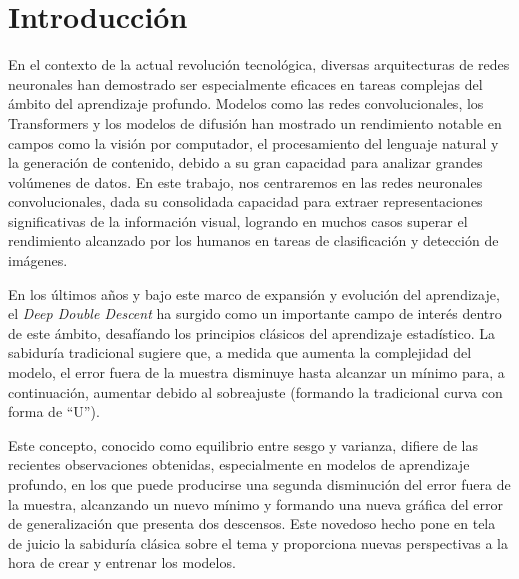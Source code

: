 %


\chapter{Introducción}

En el contexto de la actual revolución tecnológica, diversas arquitecturas de redes neuronales han demostrado ser especialmente eficaces en tareas complejas del ámbito del aprendizaje profundo. Modelos como las redes convolucionales, los Transformers y los modelos de difusión han mostrado un rendimiento notable en campos como la visión por computador, el procesamiento del lenguaje natural y la generación de contenido, debido a su gran capacidad para analizar grandes volúmenes de datos. En este trabajo, nos centraremos en las redes neuronales convolucionales, dada su consolidada capacidad para extraer representaciones significativas de la información visual, logrando en muchos casos superar el rendimiento alcanzado por los humanos en tareas de clasificación y detección de imágenes.

En los últimos años y bajo este marco de expansión y evolución del aprendizaje, el \emph{Deep Double Descent} ha surgido como un importante campo de interés dentro de este ámbito, desafíando los principios clásicos del aprendizaje estadístico. La sabiduría tradicional sugiere que, a medida que aumenta la complejidad del modelo, el error fuera de la muestra disminuye hasta alcanzar un mínimo para, a continuación, aumentar debido al sobreajuste (formando la tradicional curva con forma de ``U'').

Este concepto, conocido como equilibrio entre sesgo y varianza, difiere de las recientes observaciones obtenidas, especialmente en modelos de aprendizaje profundo, en los que puede producirse una segunda disminución del error fuera de la muestra, alcanzando un nuevo mínimo y formando una nueva gráfica del error de generalización que presenta dos descensos. Este novedoso hecho pone en tela de juicio la sabiduría clásica sobre el tema y proporciona nuevas perspectivas a la hora de crear y entrenar los modelos.

